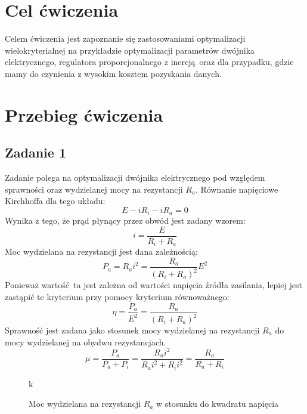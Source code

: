 \documentclass[a4paper, 12pt]{article}
\begin{document}
	\noindent
	\section{Cel ćwiczenia}
        Celem ćwiczenia jest zapoznanie się zastosowaniami optymalizacji wielokryterialnej na
        przykładzie optymalizacji parametrów dwójnika elektrycznego, regulatora proporcjonalnego 
        z inercją oraz dla przypadku, gdzie mamy do czynienia z wysokim kosztem pozyskania danych.
	\section{Przebieg ćwiczenia}
        \subsection{Zadanie 1}
            Zadanie polega na optymalizacji dwójnika elektrycznego pod względem sprawności oraz 
            wydzielanej mocy na rezystancji $R_a$. Równanie napięciowe Kirchhoffa dla tego układu:
            $$
                E - iR_i - iR_a = 0
            $$
            Wynika z tego, że prąd płynący przez obwód jest zadany wzorem:
            $$
                i = \frac{E}{R_i + R_a}
            $$
            Moc wydzielana na rezystancji jest dana zależnością:
            $$
                P_a = R_a i^2 = \frac{R_a}{(R_i + R_a)^2} E ^ 2
            $$
            Ponieważ wartość ta jest zależna od wartości napięcia źródła zasilania, lepiej jest zastąpić
            te kryterium przy pomocy kryterium równoważnego:
            $$
                \eta = \frac{P_a}{E^2} = \frac{R_a}{(R_i + R_a)^2}
            $$
            Sprawność jest zadana jako stosunek mocy wydzielanej na rezystancji $R_a$ do mocy
            wydzielanej na obydwu rezystancjach.
            $$
                \mu = \frac{P_a}{P_a + P_i} = \frac{R_ai^2}{R_ai^2 + R_ii^2} = \frac{R_a}{R_a + R_i}
            $$
            \begin{figure}[H]
                \centering
                \def \svgwidth{0.7\columnwidth}
                k
                \caption{Moc wydzielana na rezystancji $R_a$ w stosunku do kwadratu napięcia}
            \end{figure}\noindent
            
\end{document}
